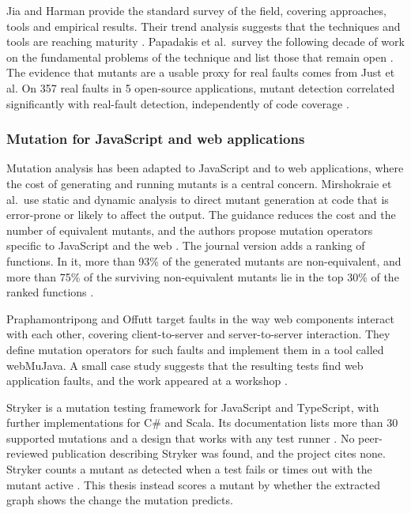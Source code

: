 Jia and Harman provide the standard survey of the field, covering approaches, tools and empirical
results. Their trend analysis suggests that the techniques and tools are reaching maturity
\cite{jia2011mutation}. Papadakis et al.\ survey the following decade of work on the fundamental
problems of the technique and list those that remain open \cite{papadakis2019mutation}. The
evidence that mutants are a usable proxy for real faults comes from Just et al. On 357 real
faults in 5 open-source applications, mutant detection
correlated significantly with real-fault detection, independently of code coverage
\cite{just2014mutants}.

\subsubsection{Mutation for JavaScript and web applications}

Mutation analysis has been adapted to JavaScript and to web applications, where the cost of
generating and running mutants is a central concern. Mirshokraie et al.\ use static and dynamic
analysis to direct mutant generation at code that is error-prone or likely to affect the output.
The guidance reduces the cost and the number of equivalent mutants, and the authors propose
mutation operators specific to JavaScript and the web \cite{mirshokraie2013efficient}. The journal
version adds a ranking of functions. In it, more than 93\% of the generated mutants are
non-equivalent, and more than 75\% of the surviving non-equivalent mutants lie in the top 30\% of
the ranked functions \cite{mirshokraie2015guided}.

Praphamontripong and Offutt target faults in the way web components interact with each other,
covering client-to-server and server-to-server interaction. They define mutation operators for
such faults and implement them in a tool called webMuJava. A small case study suggests that the
resulting tests find web application faults, and the work appeared at a workshop
\cite{praphamontripong2010applying}.

Stryker is a mutation testing framework for JavaScript and TypeScript, with further
implementations for C\# and Scala. Its documentation lists more than 30 supported mutations and a
design that works with any test runner \cite{stryker}. No peer-reviewed publication describing
Stryker was found, and the project cites none. Stryker counts a mutant as detected when a test
fails or times out with the mutant active \cite{stryker}. This thesis instead scores a mutant by
whether the extracted graph shows the change the mutation predicts.

